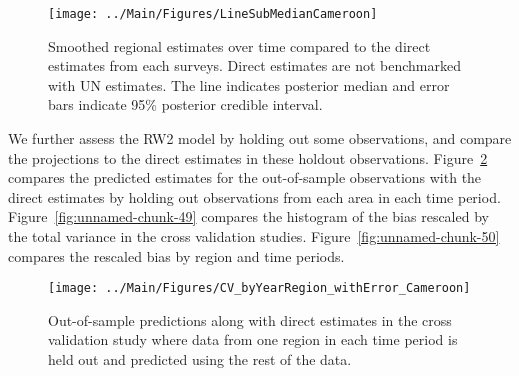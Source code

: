 \documentclass[12pt]{article}\usepackage[]{graphicx}\usepackage[]{color}
\newenvironment{knitrout}{}{} %
\begin{document}
\begin{knitrout}
\color{fgcolor}\begin{figure}[bht]

{\centering \texttt{[image: ../Main/Figures/LineSubMedianCameroon]} 

}

\caption[Smoothed regional estimates over time compared to the direct estimates from each surveys]{Smoothed regional estimates over time compared to the direct estimates from each surveys. Direct estimates are not benchmarked with UN estimates. The line indicates posterior median and error bars indicate 95\% posterior credible interval.}\label{fig:unnamed-chunk-47}
\end{figure}


\end{knitrout}
We further assess the RW2 model by holding out some observations, and compare the projections to the direct estimates in these holdout observations. Figure~\ref{fig:unnamed-chunk-48} compares the predicted estimates for the out-of-sample observations  with the direct estimates by holding out observations from each area in each time period.  Figure~\ref{fig:unnamed-chunk-49} compares the histogram of the bias rescaled by the total variance in the cross validation studies. Figure~\ref{fig:unnamed-chunk-50} compares the rescaled bias by region and time periods.



 
\begin{knitrout}
\color{fgcolor}\begin{figure}[bht]

{\centering \texttt{[image: ../Main/Figures/CV\_byYearRegion\_withError\_Cameroon]} 

}

\caption[Out-of-sample predictions along with direct estimates in the cross validation study where data from one region in each time period is held out and predicted using the rest of the data]{Out-of-sample predictions along with direct estimates in the cross validation study where data from one region in each time period is held out and predicted using the rest of the data.}\label{fig:unnamed-chunk-48}
\end{figure}


\end{knitrout}
\end{document}
